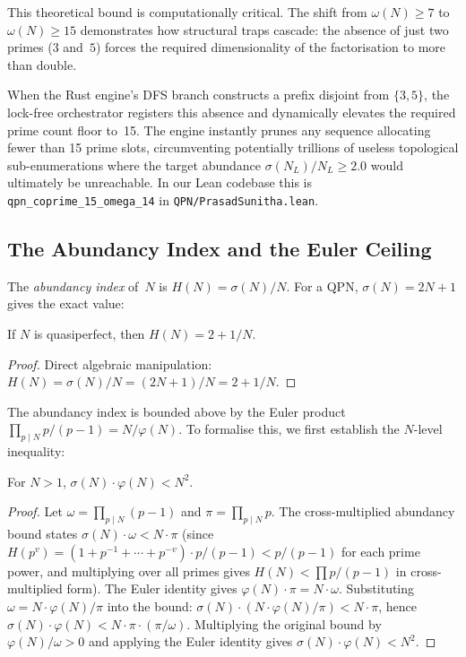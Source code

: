 This theoretical bound is computationally critical.  The shift from
$\omega(N) \ge 7$ to $\omega(N) \ge 15$ demonstrates how structural
traps cascade: the absence of just two primes ($3$ and~$5$) forces the
required dimensionality of the factorisation to more than double.

When the Rust engine's DFS branch constructs a prefix disjoint from
$\{3, 5\}$, the lock-free orchestrator registers this absence and
dynamically elevates the required prime count floor to~15.  The engine
instantly prunes any sequence allocating fewer than 15 prime slots,
circumventing potentially trillions of useless topological
sub-enumerations where the target abundance
$\sigma(N_L)/N_L \ge 2.0$ would ultimately be unreachable.
In our Lean codebase this is
\texttt{qpn\_\allowbreak{}coprime\_\allowbreak{}15\_\allowbreak{}omega\_\allowbreak{}14}
in \texttt{QPN/PrasadSunitha.lean}.


\subsection{The Abundancy Index and the Euler Ceiling}
\label{subsec:abundancy_euler_ceiling}

The \emph{abundancy index} of~$N$ is $H(N) = \sigma(N)/N$.  For a QPN,
$\sigma(N) = 2N+1$ gives the exact value:

\begin{theorem}\label{thm:qpn-abundancy}
  If $N$ is quasiperfect, then $H(N) = 2 + 1/N$.
\end{theorem}

\begin{proof}
Direct algebraic manipulation: $H(N) = \sigma(N)/N = (2N+1)/N = 2 + 1/N$.
\end{proof}

The abundancy index is bounded above by the Euler product
$\prod_{p\mid N} p/(p-1) = N/\varphi(N)$.  To formalise this, we first
establish the $N$-level inequality:

\begin{lemma}\label{lem:sigma-totient-lt-sq}
  For $N > 1$, $\sigma(N)\cdot\varphi(N) < N^2$.
\end{lemma}

\begin{proof}
Let $\omega = \prod_{p \mid N}(p-1)$ and $\pi = \prod_{p \mid N} p$.
The cross-multiplied abundancy bound states
$\sigma(N) \cdot \omega < N \cdot \pi$
(since $H(p^v) = (1 + p^{-1} + \cdots + p^{-v}) \cdot p / (p-1) < p/(p-1)$
for each prime power, and multiplying over all primes gives $H(N) < \prod p/(p-1)$
in cross-multiplied form).
The Euler identity gives $\varphi(N) \cdot \pi = N \cdot \omega$.
Substituting $\omega = N \cdot \varphi(N)/\pi$ into the bound:
$\sigma(N) \cdot (N \cdot \varphi(N)/\pi) < N \cdot \pi$,
hence $\sigma(N) \cdot \varphi(N) < N \cdot \pi \cdot (\pi / \omega)$.
Multiplying the original bound by $\varphi(N)/\omega > 0$ and applying the
Euler identity gives $\sigma(N) \cdot \varphi(N) < N^2$.
\end{proof}

